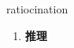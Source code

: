 
\begin{frame}
{\huge ratiocination}
\begin{center}
\begin{enumerate}\Large
  \item \textbf{推理}
\end{enumerate}
\end{center}
\end{frame}
